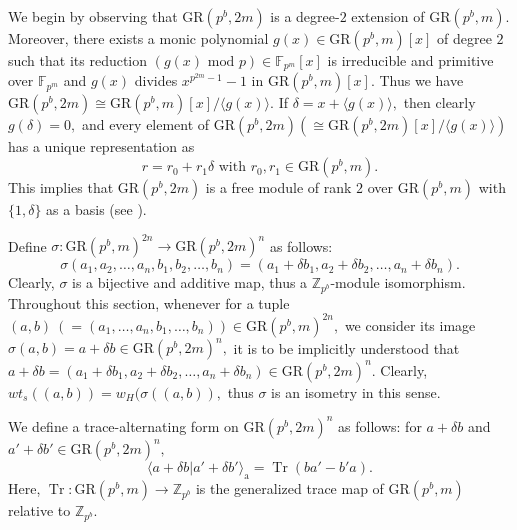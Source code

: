 \documentclass{article}
\DeclareMathOperator{\Tr}{Tr}
\theoremstyle{remark}
\theoremstyle{definition}
\numberwithin{equation}{section}
\begin{document}
We begin by observing that $\text{GR}(p^b,2m)$ is a degree-$2$ extension of $\text{GR}(p^b,m).$ Moreover, there exists a monic polynomial $g(x)\in \text{GR}(p^b,m)[x]$ of degree $2$ such that its reduction $(g(x) \text{ mod } p) \in \mathbb{F}_{p^m}[x]$ is irreducible and primitive over $\mathbb{F}_{p^m}$ and $g(x)$ divides $x^{p^{2m}-1}-1$ in $\text{GR}(p^b,m)[x].$ Thus we have  $\text{GR}(p^b,2m) \cong \text{GR}(p^b,m) [x]/ \langle g(x) \rangle.$ 
If $\delta=x+\langle g(x) \rangle,$ then clearly $g(\delta)=0,$ and every element of $\text{GR}(p^b,2m) (\cong \text{GR}(p^b,2m)[x]/ \langle g(x) \rangle)$ has a unique representation as $$r=r_0+r_1\delta\text{~with~} r_0,r_1 \in \text{GR}(p^b,m).$$
This implies that $\text{GR}(p^b,2m)$ is a free module of rank $2$ over  $\text{GR}(p^b,m)$ with $\{1,\delta\}$ as a basis (see \cite[Ch.\ 14]{wan}).  

Define $\sigma: \text{GR}(p^b,m)^{2n} \to \text{GR}(p^b,2m)^n $ as follows:
  $$\sigma(a_1,a_2,\ldots,a_n, b_1,b_2,\ldots,b_n) =(a_1+\delta b_1,a_2+\delta b_2,\ldots,a_n+\delta b_n).$$ Clearly, $\sigma$ is a bijective and  additive map, thus a $\mathbb{Z}_{p^b}$-module isomorphism. 
  Throughout this section, whenever for a tuple $(a,b)~ (=(a_1,\ldots,a_n, b_1,\ldots,b_n)) \in \text{GR}(p^b,m)^{2n},$   we consider its image $\sigma(a,b)=a+\delta b\in \text{GR}(p^b,2m)^n,$ it is to be implicitly understood that $a+\delta b=(a_1+\delta b_1,a_2+\delta b_2,\ldots,a_n+\delta b_n) \in \text{GR}(p^b,2m)^n.$   
Clearly, $wt_s((a,b) )=w_H(\sigma((a,b)),$ thus $\sigma$ is an isometry in this sense. 

We define a trace-alternating form on $\text{GR}(p^b,2m)^{n}$ as follows: for $ a+\delta b$ and $ a'+\delta b' \in \text{GR}(p^b,2m)^{n},$
$${\langle a+\delta b |  a'+\delta b' \rangle}_{\mathrm{a}} = \Tr(ba'-b'a).$$ Here, ${\Tr}: \text{GR}(p^b,m) \to \mathbb{Z}_{p^b}$ is the generalized trace map of  $\text{GR}(p^b,m)$ relative to $\mathbb{Z}_{p^b}.$
\end{document}
